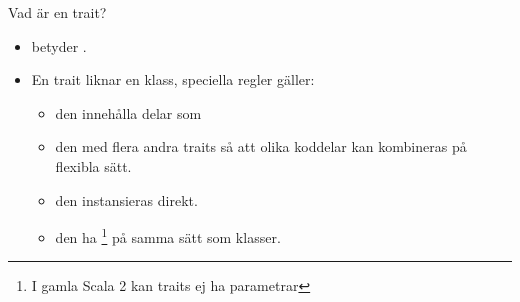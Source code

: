 \begin{Slide}{Vad är en trait?}
\begin{itemize}
\item {} betyder .

\item En trait liknar en klass,  speciella regler gäller:

\begin{itemize}

\item den  innehålla delar som 

\item den  med flera andra traits så att olika koddelar kan kombineras på flexibla sätt.

\item den  instansieras direkt.

\item den  ha \footnote{I gamla Scala 2 kan traits ej ha parametrar} på samma sätt som klasser.
\end{itemize}
\end{itemize}

\end{Slide}

